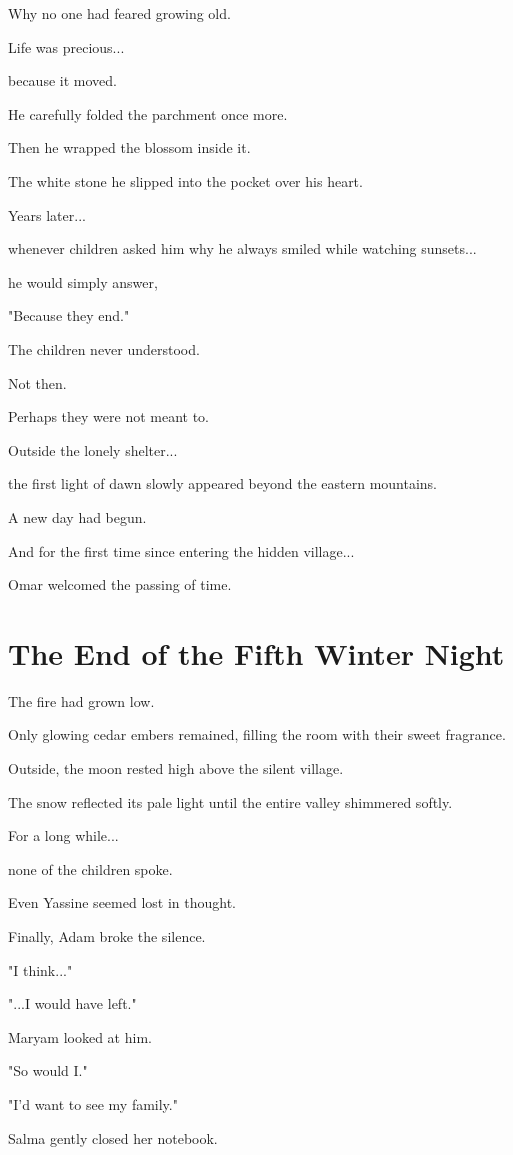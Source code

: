 \documentclass[12pt,openany]{book}
\begin{document}
Why no one had feared growing old.

Life was precious...

because it moved.

He carefully folded the parchment once more.

Then he wrapped the blossom inside it.

The white stone he slipped into the pocket over his heart.

Years later...

whenever children asked him why he always smiled while watching sunsets...

he would simply answer,

"Because they end."

The children never understood.

Not then.

Perhaps they were not meant to.

Outside the lonely shelter...

the first light of dawn slowly appeared beyond the eastern mountains.

A new day had begun.

And for the first time since entering the hidden village...

Omar welcomed the passing of time.
\section*{The End of the Fifth Winter Night}

The fire had grown low.

Only glowing cedar embers remained, filling the room with their sweet fragrance.

Outside, the moon rested high above the silent village.

The snow reflected its pale light until the entire valley shimmered softly.

For a long while...

none of the children spoke.

Even Yassine seemed lost in thought.

Finally, Adam broke the silence.

"I think..."

"...I would have left."

Maryam looked at him.

"So would I."

"I'd want to see my family."

Salma gently closed her notebook.
\end{document}
